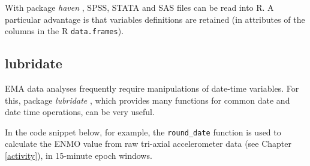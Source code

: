 \documentclass[]{book}
\newenvironment{Shaded}{\begin{snugshade}}{\end{snugshade}}
\newcommand{\KeywordTok}[1]{\textcolor[rgb]{0.13,0.29,0.53}{\textbf{#1}}}
\newcommand{\DataTypeTok}[1]{\textcolor[rgb]{0.13,0.29,0.53}{#1}}
\newcommand{\StringTok}[1]{\textcolor[rgb]{0.31,0.60,0.02}{#1}}
\newcommand{\CommentTok}[1]{\textcolor[rgb]{0.56,0.35,0.01}{\textit{#1}}}
\newcommand{\OperatorTok}[1]{\textcolor[rgb]{0.81,0.36,0.00}{\textbf{#1}}}
\newcommand{\NormalTok}[1]{#1}
\begin{document}
 

With package \emph{haven} \citep{R-haven}, SPSS, STATA and SAS files can
be read into R. A particular advantage is that variables definitions are
retained (in attributes of the columns in the R \texttt{data.frames}).

\begin{Shaded}
\end{Shaded}

\subsection{lubridate}\label{lubridate}

 

EMA data analyses frequently require manipulations of date-time
variables. For this, package \emph{lubridate} \citep{R-lubridate}, which
provides many functions for common date and date time operations, can be
very useful.

In the code snippet below, for example, the \texttt{round\_date}
function is used to calculate the ENMO value from raw tri-axial
accelerometer data (see Chapter \ref{activity}), in 15-minute epoch
windows.
\end{document}
